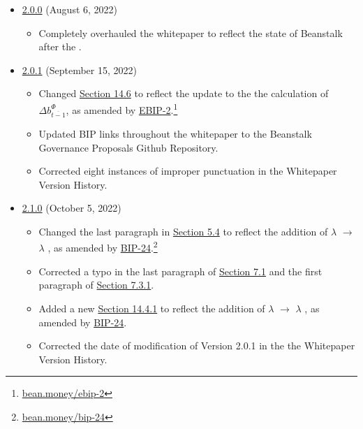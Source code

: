 \documentclass[class=article, crop=false]{standalone}
\begin{document}
\begin{itemize}[topsep=0pt, itemsep=3pt,leftmargin=16pt]
\begin{itemize}
    \end{itemize}  
        \item \href{https://github.com/BeanstalkFarms/Beanstalk-Whitepaper/blob/master/version-history/beanstalk2_0_0.pdf}{2.0.0} (August 6, 2022)
    \begin{itemize}
        \item Completely overhauled the whitepaper to reflect the state of Beanstalk after the .
    \end{itemize}  
        \item \href{https://github.com/BeanstalkFarms/Beanstalk-Whitepaper/blob/master/version-history/beanstalk2_0_1.pdf}{2.0.1} (September 15, 2022)
    \begin{itemize}
        \item Changed \hyperlink{subsection.14.6}{Section 14.6} to reflect the update to the the calculation of $\Delta b_{\overline{t-1}}^{\Phi}$, as amended by \href{https://bean.money/ebip-2}{EBIP-2}.\footnote{\href{https://bean.money/ebip-2}{bean.money/ebip-2}}
        \item Updated BIP links throughout the whitepaper to the Beanstalk Governance Proposals Github Repository.
        \item Corrected eight instances of improper punctuation in the Whitepaper Version History.
    \end{itemize}  
        \item \href{https://github.com/BeanstalkFarms/Beanstalk-Whitepaper/blob/master/version-history/beanstalk2_1_0.pdf}{2.1.0} (October 5, 2022)
    \begin{itemize}
        \item Changed the last paragraph in \hyperlink{subsection.5.4}{Section 5.4} to reflect the addition of $\lambda$ $\rightarrow$ $\lambda$ , as amended by \href{https://bean.money/bip-24}{BIP-24}.\footnote{\href{https://bean.money/bip-24}{bean.money/bip-24}}
        \item Corrected a typo in the last paragraph of \hyperlink{subsection.7.1}{Section 7.1} and the first paragraph of \hyperlink{subsubsection.7.3.1}{Section 7.3.1}.
        \item Added a new \hyperlink{subsubsection.14.4.1}{Section 14.4.1} to reflect the addition of $\lambda$ $\rightarrow$ $\lambda$ , as amended by \href{https://bean.money/bip-24}{BIP-24}.
        \item Corrected the date of modification of Version 2.0.1 in the the Whitepaper Version History.

\end{itemize}
\end{itemize}
\end{document}
